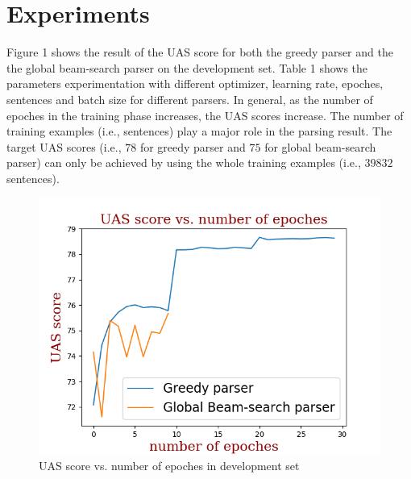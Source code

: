 \documentclass[11pt,a4paper]{article}
\begin{document}
\section{Experiments}

Figure 1 shows the result of the UAS score for both the greedy parser and the
the global beam-search parser on the development set. Table 1 shows the parameters
experimentation with different optimizer, learning rate, epoches, sentences and batch
size for different parsers. In general, as the number of epoches in the training phase increases, 
the UAS scores increase. The number of training examples (i.e., sentences) play a major role
in the parsing result. The target UAS scores (i.e., $78$ for greedy parser and $75$ for global beam-search parser)
can only be achieved by using the whole training examples (i.e., $39832$ sentences).

\begin{figure}[h]
\includegraphics[scale=0.5]{uas.png}
\caption{UAS score vs. number of epoches in development set}
\end{figure}
\end{document}
